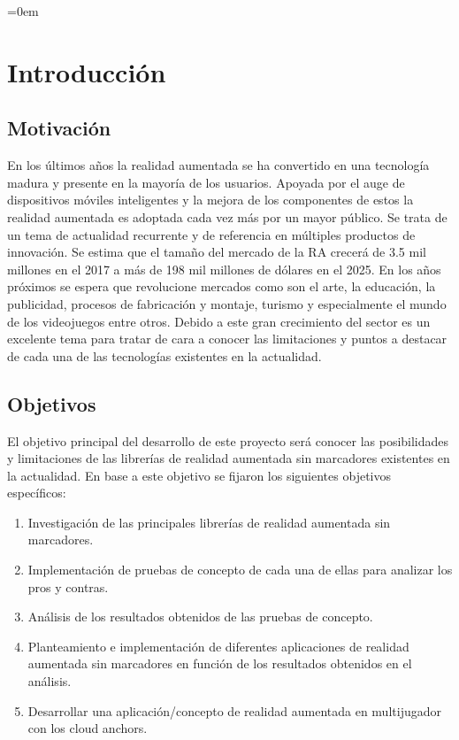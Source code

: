 \parindent=0em
\chapter{Introducción}
\noindent
\section{Motivación}
En los últimos años la realidad aumentada se ha convertido en una tecnología madura y presente en la mayoría de los usuarios. Apoyada por el auge de dispositivos móviles inteligentes y la mejora de los componentes de estos la realidad aumentada es adoptada cada vez más por un mayor público. Se trata de un tema de actualidad recurrente y de referencia en múltiples productos de innovación.\vspace{\baselineskip}
Se estima que el tamaño del mercado de la RA crecerá de 3.5 mil millones en el 2017 a más de 198 mil millones de dólares en el 2025.\cite{Statista} En los años próximos se espera que revolucione mercados como son el arte, la educación, la publicidad, procesos de fabricación y montaje, turismo y especialmente el mundo de los videojuegos entre otros. Debido a este gran crecimiento del sector es un excelente tema para tratar de cara a conocer las limitaciones y puntos a destacar de cada una de las tecnologías existentes en la actualidad. 
\section{Objetivos}
El objetivo principal del desarrollo de este proyecto será conocer las posibilidades y limitaciones de las librerías de realidad aumentada sin marcadores existentes en la actualidad. En base a este objetivo se fijaron los siguientes objetivos específicos:
\begin{enumerate}
\item Investigación de las principales librerías de realidad aumentada sin marcadores.
\item Implementación de pruebas de concepto de cada una de ellas para analizar los pros y contras.
\item Análisis de los resultados obtenidos de las pruebas de concepto.
\item Planteamiento e implementación de diferentes aplicaciones de realidad aumentada sin marcadores en función de los resultados obtenidos en el análisis.
\item Desarrollar una aplicación/concepto de realidad aumentada en multijugador con los cloud anchors.
\end{enumerate}

